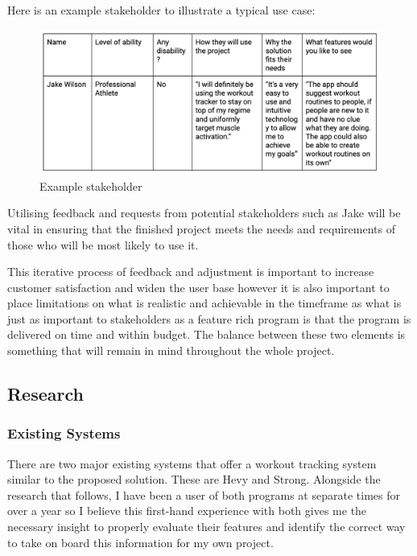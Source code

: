 \documentclass{article}
\begin{document}
Here is an example stakeholder to illustrate a typical use case:

\begin{figure}[ht]
  \centering
  \includegraphics[width=1\textwidth]{img/Figure 3.png}
  \caption{Example stakeholder}
\end{figure}

Utilising feedback and requests from potential stakeholders such as Jake will be vital in ensuring that the finished project meets the needs and requirements of those who will be most likely to use it.

This iterative process of feedback and adjustment is important to increase customer satisfaction and widen the user base however it is also important to place limitations on what is realistic and achievable in the timeframe as what is just as important to stakeholders as a feature rich program is that the program is delivered on time and within budget. The balance between these two elements is something that will remain in mind throughout the whole project. 

\subsection{Research}

\subsubsection{Existing Systems}
There are two major existing systems that offer a workout tracking system similar to the proposed solution. These are Hevy and Strong. Alongside the research that follows, I have been a user of both programs at separate times for over a year so I believe this first-hand experience with both gives me the necessary insight to properly evaluate their features and identify the correct way to take on board this information for my own project. 
\end{document}
